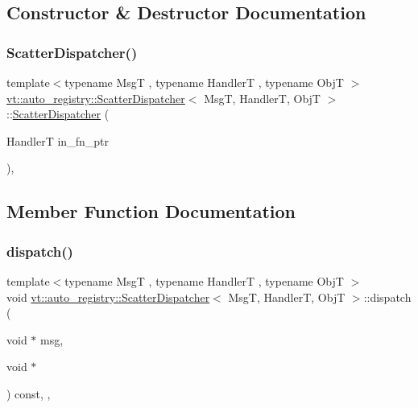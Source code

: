 \subsection{Constructor \& Destructor Documentation}
\mbox{\label{structvt_1_1auto__registry_1_1_scatter_dispatcher_a1059ed7e28fe51d138a6945593dce385}} 
\subsubsection{\texorpdfstring{Scatter\+Dispatcher()}{ScatterDispatcher()}}
{\footnotesize\ttfamily template$<$typename MsgT , typename HandlerT , typename ObjT $>$ \\
\hyperlink{structvt_1_1auto__registry_1_1_scatter_dispatcher}{vt\+::auto\+\_\+registry\+::\+Scatter\+Dispatcher}$<$ MsgT, HandlerT, ObjT $>$\+::\hyperlink{structvt_1_1auto__registry_1_1_scatter_dispatcher}{Scatter\+Dispatcher} (\begin{DoxyParamCaption}\item[{HandlerT}]{in\+\_\+fn\+\_\+ptr }\end{DoxyParamCaption})\hspace{0.3cm}{\ttfamily [inline]}, {\ttfamily [explicit]}}



\subsection{Member Function Documentation}
\mbox{\label{structvt_1_1auto__registry_1_1_scatter_dispatcher_a37e6677295c03cc4f20794286984cb5e}} 
\subsubsection{\texorpdfstring{dispatch()}{dispatch()}}
{\footnotesize\ttfamily template$<$typename MsgT , typename HandlerT , typename ObjT $>$ \\
void \hyperlink{structvt_1_1auto__registry_1_1_scatter_dispatcher}{vt\+::auto\+\_\+registry\+::\+Scatter\+Dispatcher}$<$ MsgT, HandlerT, ObjT $>$\+::dispatch (\begin{DoxyParamCaption}\item[{void $\ast$}]{msg,  }\item[{void $\ast$}]{ }\end{DoxyParamCaption}) const\hspace{0.3cm}{\ttfamily [inline]}, {\ttfamily [override]}, {\ttfamily [virtual]}}



